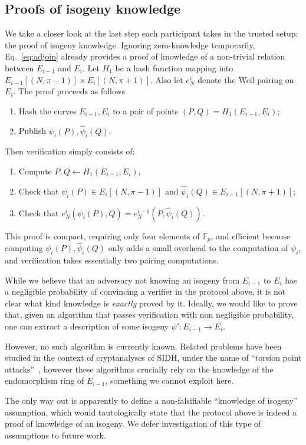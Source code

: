 \documentclass{llncs}
\newcommand{\F}{\mathbb{F}}
\begin{document}
\subsection{Proofs of isogeny knowledge}

We take a closer look at the last step each participant takes in the
trusted setup: the proof of isogeny knowledge. %
Ignoring zero-knowledge temporarily, Eq.~\eqref{eq:adjoin} already
provides a proof of knowledge of a non-trivial relation between
$E_{i-1}$ and $E_i$. %
Let $H_1$ be a hash function mapping into
$E_{i-1}[(N,\pi-1)] \times E_i[(N,\pi+1)]$.
Also let $e_N^i$ denote the Weil pairing on $E_i$.
The proof proceeds as follows
\begin{enumerate}
\item Hash the curves $E_{i-1},E_i$ to a pair of points
  $(P,Q) = H_1(E_{i-1},E_i)$;
\item Publish $\psi_i(P), \hat\psi_i(Q)$.
\end{enumerate}
Then verification simply consists of:
\begin{enumerate}
\item Compute $P,Q\gets H_1(E_{i-1},E_i)$,
\item Check that $\psi_i(P)\in E_i[(N,\pi-1)]$ and
  $\hat\psi_i(Q)\in E_{i-1}[(N,\pi+1)]$;
\item Check that $e_N^i(\psi_i(P),Q) = e_N^{i-1}(P,\hat\psi_i(Q))$.
\end{enumerate}

This proof is compact, requiring only four elements of $\F_p$, and
efficient because computing $\psi_i(P),\hat\psi_i(Q)$ only adds a
small overhead to the computation of $\psi_i$, and verification takes
essentially two pairing computations. %

\begin{remark}
  While we believe that an adversary not knowing an isogeny from
  $E_{i-1}$ to $E_i$ has a negligible probability of convincing a
  verifier in the protocol above, it is not clear what kind knowledge
  is \emph{exactly} proved by it. %
  Ideally, we would like to prove that, given an algorithm that passes
  verification with non negligible probability, one can extract a
  description of some isogeny $\psi':E_{i-1}\to E_{i}$. %

  However, no such algorithm is currently known. %
  Related problems have been studied in the context of cryptanalyses
  of SIDH, under the name of ``torsion point
  attacks''~\cite{10.1007/978-3-319-70697-9_12,cryptoeprint:2019:1291,cryptoeprint:2020:633},
  however these algorithms crucially rely on the knowledge of the
  endomorphism ring of $E_{i-1}$, something we cannot exploit here.

  The only way out is apparently to define a non-falsifiable
  ``knowledge of isogeny'' assumption, which would tautologically
  state that the protocol above is indeed a proof of knowledge of an
  isogeny. %
  We defer investigation of this type of assumptions to future work.
\end{remark}
\end{document}
